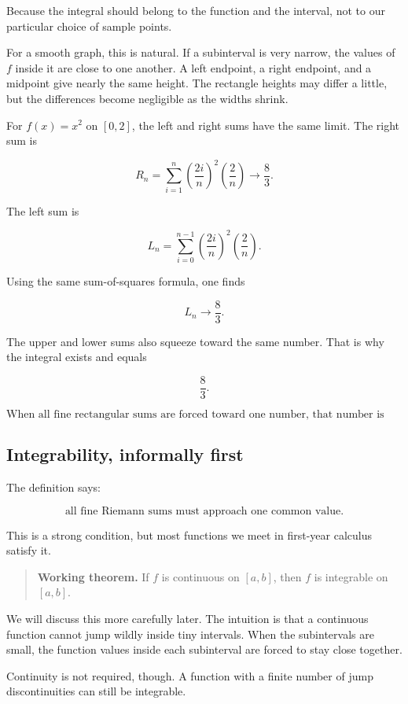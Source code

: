 Because the integral should belong to the function and the interval, not to our particular
choice of sample points.

For a smooth graph, this is natural.  If a subinterval is very narrow, the values of \(f\)
inside it are close to one another.  A left endpoint, a right endpoint, and a midpoint give
nearly the same height.  The rectangle heights may differ a little, but the differences
become negligible as the widths shrink.

For \(f(x)=x^2\) on \([0,2]\), the left and right sums have the same limit.  The right
sum is

\[
R_n=
\sum_{i=1}^{n}
\left(\frac{2i}{n}\right)^2
\left(\frac{2}{n}\right)
\to
\frac83.
\]

The left sum is

\[
L_n=
\sum_{i=0}^{n-1}
\left(\frac{2i}{n}\right)^2
\left(\frac{2}{n}\right).
\]

Using the same sum-of-squares formula, one finds

\[
L_n\to\frac83.
\]

The upper and lower sums also squeeze toward the same number.  That is why the
integral exists and equals

\[
\frac83.
\]

\[
\boxed{
\text{When all fine rectangular sums are forced toward one number, that number is the integral.}
}
\]

\subsection{Integrability, informally first}
\label{subsec:integrability-informally-first}

The definition says:

\[
\text{all fine Riemann sums must approach one common value.}
\]

This is a strong condition, but most functions we meet in first-year calculus satisfy it.

\begin{quote}
\textbf{Working theorem.}
If \(f\) is continuous on \([a,b]\), then \(f\) is integrable on \([a,b]\).
\end{quote}

We will discuss this more carefully later.  The intuition is that a continuous function
cannot jump wildly inside tiny intervals.  When the subintervals are small, the function
values inside each subinterval are forced to stay close together.

Continuity is not required, though.  A function with a finite number of jump
discontinuities can still be integrable.

